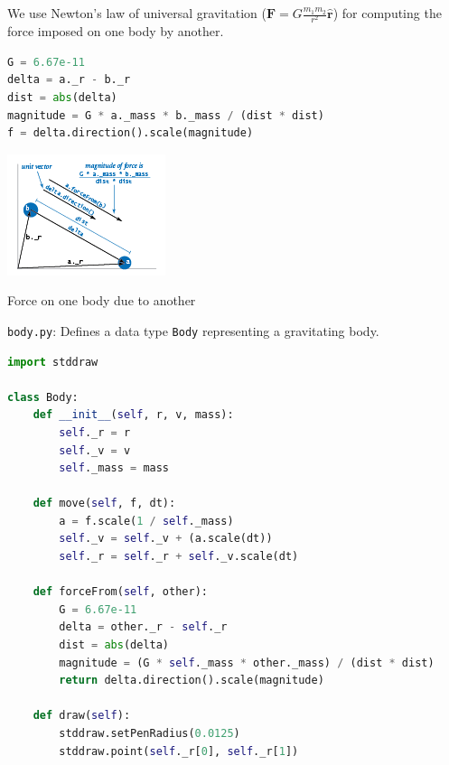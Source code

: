 \documentclass[8pt,a4paper,compress,handout]{beamer}
\begin{document}
\begin{frame}[fragile]
We use Newton's law of universal gravitation ($\mathbf{F}=G\frac{m_1m_2}{r^2}\hat{\mathbf{r}}$) for computing the force imposed on one body by another.

\begin{lstlisting}[language=Python]
G = 6.67e-11
delta = a._r - b._r
dist = abs(delta)
magnitude = G * a._mass * b._mass / (dist * dist)
f = delta.direction().scale(magnitude)
\end{lstlisting}

\begin{center}
\includegraphics[scale=0.5]{figures/vector_force.png}

\smallskip

\tiny Force on one body due to another
\end{center}
\end{frame}

\begin{frame}[fragile]
\begin{framed}
\tiny \lstinline{body.py}: Defines a data type \lstinline{Body} representing a gravitating body.
\end{framed}

\begin{lstlisting}[language=Python]
import stddraw

class Body:
    def __init__(self, r, v, mass):
        self._r = r
        self._v = v
        self._mass = mass

    def move(self, f, dt):
        a = f.scale(1 / self._mass)
        self._v = self._v + (a.scale(dt))
        self._r = self._r + self._v.scale(dt)

    def forceFrom(self, other):
        G = 6.67e-11
        delta = other._r - self._r
        dist = abs(delta)
        magnitude = (G * self._mass * other._mass) / (dist * dist)
        return delta.direction().scale(magnitude)

    def draw(self):
        stddraw.setPenRadius(0.0125)
        stddraw.point(self._r[0], self._r[1])
\end{lstlisting}
\end{frame}
\end{document}
